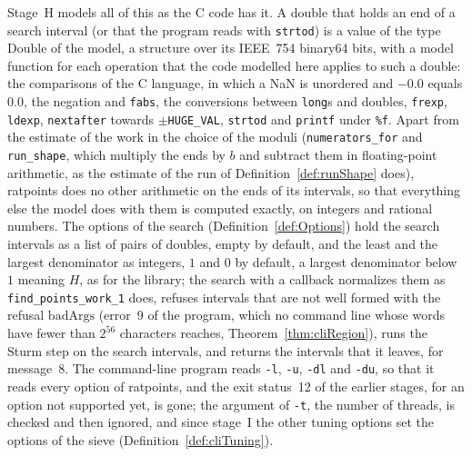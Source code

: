 Stage~H models all of this as the C code has it. A double that holds an end of a search interval (or
that the program reads with \verb|strtod|) is a value of the type $\mathrm{Double}$ of the model, a
structure over its IEEE~754 binary64 bits, with a model function for each operation that the code
modelled here applies to such a double: the comparisons of the C language, in which a NaN is
unordered and $-0.0$ equals $0.0$, the negation and \verb|fabs|, the conversions between
\verb|long|s and doubles, \verb|frexp|, \verb|ldexp|, \verb|nextafter| towards $\pm$\verb|HUGE_VAL|,
\verb|strtod| and \verb|printf| under \verb|%f|. Apart from the estimate of the work in the choice
of the moduli (\verb|numerators_for| and \verb|run_shape|, which multiply the ends by $b$ and
subtract them in floating-point arithmetic, as the estimate of the run of
Definition~\ref{def:runShape} does), ratpoints does no other arithmetic on the ends of its
intervals, so that everything else the model does with them is computed exactly, on integers and
rational numbers. The options of the search (Definition~\ref{def:Options}) hold the search intervals
as a list of pairs of doubles, empty by default, and the least and the largest denominator as
integers, $1$ and $0$ by default, a largest denominator below $1$ meaning $H$, as for the library;
the search with a callback normalizes them as \verb|find_points_work_1| does, refuses intervals that
are not well formed with the refusal $\mathrm{badArgs}$ (error~9 of the program, which no command
line whose words have fewer than $2^{56}$ characters reaches, Theorem~\ref{thm:cliRegion}), runs the
Sturm step on the search intervals, and returns the intervals that it leaves, for message~8. The
command-line program reads \verb|-l|, \verb|-u|, \verb|-dl| and \verb|-du|, so that it reads every
option of ratpoints, and the exit status~12 of the earlier stages, for an option not supported yet,
is gone; the argument of \verb|-t|, the number of threads, is checked and then ignored, and since
stage~I the other tuning options set the options of the sieve (Definition~\ref{def:cliTuning}).

